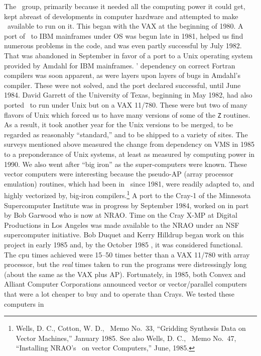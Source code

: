 The \AIPS\ group, primarily because it needed all the computing power
it could get, kept abreast of developments in computer hardware and
attempted to make \AIPS\ available to run on it.  This began with the
VAX at the beginning of 1980.  A port of \AIPS\ to IBM mainframes
under OS was begun late in 1981, helped us find numerous problems in
the code, and was even partly successful by July 1982.  That was
abandoned in September in favor of a port to a Unix operating system
provided by Amdahl for IBM mainframes.  \AIPS' dependency on correct
Fortran compilers was soon apparent, as were layers upon layers of
bugs in Amdahl's compiler.  These were not solved, and the port
declared successful, until June 1984.  David Garrett of the University
of Texas, beginning in May 1982, had also ported \AIPS\ to run under
Unix but on a VAX 11/780.  These were but two of many flavors of Unix
which forced us to have many versions of some of the {\tt Z} routines.
As a result, it took another year for the Unix versions to be merged,
to be regarded as reasonably ``standard,'' and to be shipped to a
variety of sites.  The surveys mentioned above measured the change
from dependency on VMS in 1985 to a preponderance of Unix systems, at
least as measured by computing power in 1990.  We also went after
``big iron'' as the super-computers were known.  These vector
computers were interesting because the pseudo-AP (array processor
emulation) routines, which had been in \AIPS\ since 1981, were readily
adapted to, and highly vectorized by, big-iron
compilers.\footnote{Wells, D. C., Cotton, W. D., \AIPS\ Memo No.~33,
``Gridding Synthesis Data on Vector Machines,'' January 1985.  See
also Wells, D. C., \AIPS\ Memo No.~47, ``Installing NRAO's \AIPS\ on
vector Computers,'' June, 1985.}  A port to the Cray-1 of the
Minnesota Supercomputer Institute was in progress by September 1984,
worked on in part by Bob Garwood who is now at \hbox{NRAO}.  Time on
the Cray X-MP at Digital Productions in Los Angeles was made available
to the NRAO under an NSF supercomputer initiative.  Bob Duquet and
Kerry Hilldrup began work on this project in early 1985 and, by the
October 1985 \Aipsletter, it was considered functional.  The cpu times
achieved were 15--50 times better than a VAX 11/780 with array
processor, but the {\it real} times taken to run the programs were
distressingly long (about the same as the VAX plus \hbox{AP}).
Fortunately, in 1985, both Convex and Alliant Computer Corporations
announced vector or vector/parallel computers that were a lot cheaper
to buy and to operate than Crays.  We tested these computers in
